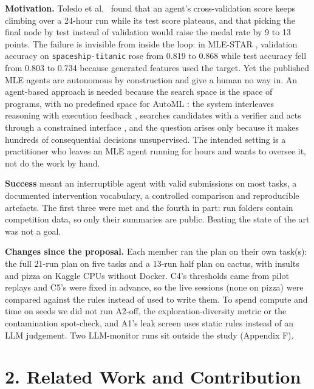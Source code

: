 \documentclass[11pt]{article}
\begin{document}
\textbf{Motivation.} Toledo et al.\ \cite{aira} found that an agent's cross-validation
score keeps climbing over a 24-hour run while its test score plateaus, and that picking
the final node by test instead of validation would raise the medal rate by 9 to 13
points. The failure is invisible from inside the loop: in MLE-STAR \cite{mlestar},
validation accuracy on \texttt{spaceship-titanic} rose from 0.819 to 0.868 while test
accuracy fell from 0.803 to 0.734 because generated features used the target. Yet the
published MLE agents \cite{aide,aira,mlestar,mlmaster,mlmaster2} are autonomous by
construction and give a human no way in. An agent-based approach is needed because the
search space is the space of programs, with no predefined space for AutoML
\cite{aide}: the system interleaves reasoning with execution feedback \cite{react},
searches candidates with a verifier \cite{tot} and acts through a constrained interface
\cite{sweagent}, and the question arises only because it makes hundreds of
consequential decisions unsupervised. The intended setting is a practitioner who leaves
an MLE agent running for hours and wants to oversee it, not do the work by hand.

\textbf{Success} meant an interruptible agent with valid submissions on most tasks, a
documented intervention vocabulary, a controlled comparison and reproducible artefacts.
The first three were met and the fourth in part: run folders contain competition data,
so only their summaries are public. Beating the state of the art was not a goal.

\textbf{Changes since the proposal.} Each member ran the plan on their own task(s):
the full 21-run plan on five tasks and a 13-run half plan on cactus, with insults and
pizza on Kaggle CPUs without Docker. C4's thresholds came from pilot replays and C5's
were fixed in advance, so the live sessions (none on pizza) were compared against the
rules instead of used to write them. To spend compute and time on seeds we did not run
A2-off, the exploration-diversity metric or the contamination spot-check, and A1's leak
screen uses static rules instead of an LLM judgement. Two LLM-monitor runs sit outside
the study (Appendix F).

\section*{2. Related Work and Contribution}
\end{document}
